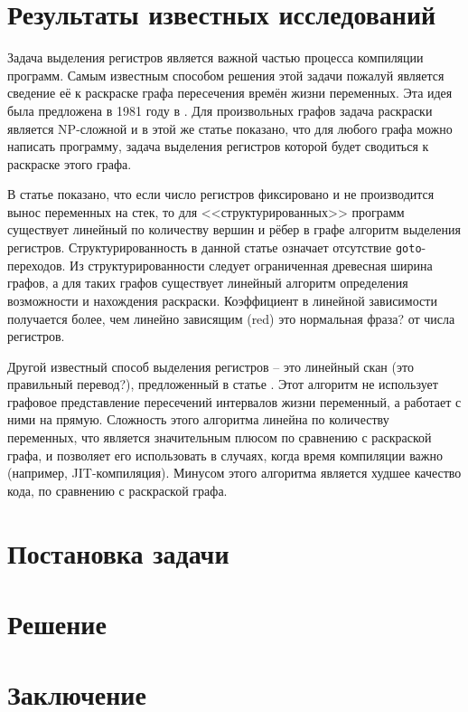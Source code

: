 \documentclass[a4paper,14pt]{extarticle}
\begin{document}
\section{Результаты известных исследований}

Задача выделения регистров является важной частью процесса компиляции программ. Самым известным способом решения этой задачи пожалуй является сведение её к раскраске графа пересечения времён жизни переменных. Эта идея была предложена в 1981 году в \cite{chaitin_register_1981}. Для произвольных графов задача раскраски является NP-сложной и в этой же статье показано, что для любого графа можно написать программу, задача выделения регистров которой будет сводиться к раскраске этого графа.

В статье \cite{hans_l_bodlaender_linear-time_1997} показано, что если число регистров фиксировано и не производится вынос переменных на стек, то для <<структурированных>> программ существует линейный по количеству вершин и рёбер в графе алгоритм выделения регистров. Структурированность в данной статье означает отсутствие \texttt{goto}-переходов. Из структурированности следует ограниченная древесная ширина графов, а для таких графов существует линейный алгоритм определения возможности и нахождения раскраски. Коэффициент в линейной зависимости получается более, чем линейно зависящим {\color(red) это нормальная фраза?} от числа регистров.

Другой известный способ выделения регистров -- это линейный скан {\color{red} (это правильный перевод?)}, предложенный в статье \cite{poletto_linear_1999}. Этот алгоритм не использует графовое представление пересечений интервалов жизни переменный, а работает с ними на прямую. Сложность этого алгоритма линейна по количеству переменных, что является значительным плюсом по сравнению с раскраской графа, и позволяет его использовать в случаях, когда время компиляции важно (например, JIT-компиляция). Минусом этого алгоритма является худшее качество кода, по сравнению с раскраской графа.

\section{Постановка задачи}

\section{Решение}

\section{Заключение}

\newpage



\end{document}
